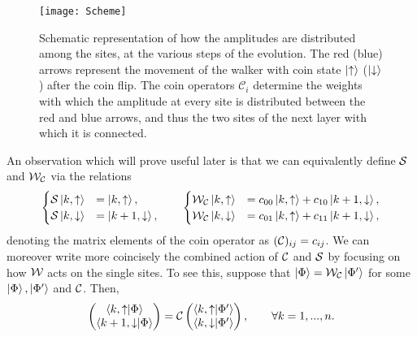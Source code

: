 \begin{figure}[tb]
\center
\texttt{[image: Scheme]}
\caption{
    Schematic representation of how the amplitudes are distributed among the sites, at the various steps of the evolution.
    The red (blue) arrows represent the movement of the walker with coin state $\ket\uparrow$ ($\ket\downarrow$) after the coin flip.
    The coin operators $\mathcal C_i$ determine the weights with which the amplitude at every site is distributed between the red and blue arrows, and thus the two sites of the next layer with which it is connected.
}
\label{fig:qw_conceptual_scheme_walker}
\end{figure}

An observation which will prove useful later  is that we can equivalently define ${\mathcal{S}}$ and ${\mathcal{W}}_{\mathcal{C}}$ via the relations
\begin{equation}
\begin{cases}
    {\mathcal{S}}\ket{k,\uparrow} &= \ket{k,\uparrow}, \\
    {\mathcal{S}}\ket{k,\downarrow} &= \ket{k+1, \downarrow},
\end{cases}
\qquad
\begin{cases}
    {\mathcal{W}}_{\mathcal{C}}\ket{k,\uparrow} &= c_{00} \ket{k,\uparrow} + c_{10} \ket{k+ 1,\downarrow}, \\
    {\mathcal{W}}_{\mathcal{C}}\ket{k,\downarrow} &= c_{01}\ket{k, \uparrow} + c_{11} \ket{k+1, \downarrow},
\end{cases}
\end{equation}
denoting the matrix elements of the coin operator as $({\mathcal{C}})_{ij}=c_{ij}$.
We can moreover write more coincisely the combined action of ${\mathcal{C}}$ and ${\mathcal{S}}$ by focusing on how ${\mathcal{W}}$ acts on the single sites.
To see this, suppose that $\ket{\Phi}={\mathcal{W}}_{\mathcal{C}}\ket{\Phi'}$ for some $\ket{\Phi},\ket{\Phi'}$ and ${\mathcal{C}}$.
Then,
\begin{equation}
    \begin{pmatrix}
        \braket{k,\uparrow}{\Phi} \\
        \braket{k + 1, \downarrow}{\Phi}
    \end{pmatrix} =
    {\mathcal{C}} \begin{pmatrix}
        \braket{k,\uparrow}{\Phi'} \\
        \braket{k,\downarrow}{\Phi'}
    \end{pmatrix},
    \qquad \forall k=1,...,n.
    \label{eq:qw_dynamics_on_single_positions}
\end{equation}
